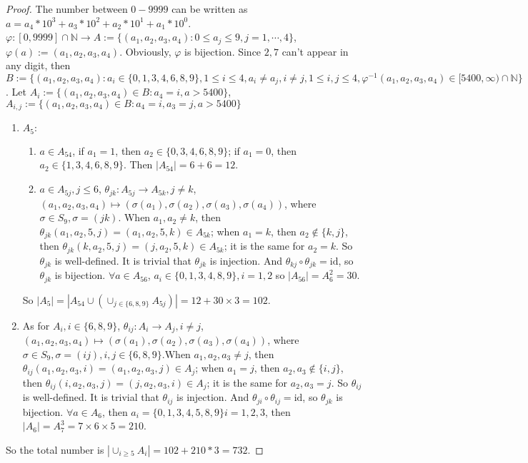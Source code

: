 \documentclass{ctexart}
\newcommand\N{\mathbb {N}}
\renewcommand\phi{\varphi}
\renewcommand{\(}{\left(}
\renewcommand{\)}{\right)}
\newcommand{\id}{\mathrm{id}}
\begin{document}
\begin{proof}
    The number between $0-9999$ can be written as $a = a_4*10^3+a_3*10^2+a_2*10^1+a_1*10^0$. $\phi: [0,9999]\cap \N\to A:=\{(a_1,a_2,a_3,a_4):0\leq a_j\leq 9, j=1,\cdots, 4\}$,  $\phi(a):=(a_1,a_2,a_3,a_4)$. Obviously, $\phi$ is bijection. 
    Since $2,7$ can't appear in any digit, then $
    B:=\{(a_1,a_2,a_3,a_4) : a_i\in\{0,1,3,4,6,8,9\}, 1\leq i\leq 4, a_i \neq a_j, i\neq j, 1\leq i,j\leq 4, \phi^{-1}(a_1,a_2,a_3,a_4)\in[5400,\infty)\cap\N\}$. Let $A_i:=\{(a_1,a_2,a_3,a_4)\in B: a_4=i, a>5400\}$, $A_{i,j}:=\{(a_1,a_2,a_3,a_4)\in B:a_4=i, a_3=j, a>5400 \}$
    \begin{enumerate}
        \item  $A_{5}:$
        \begin{enumerate}
        \item $a\in A_{54}$, if $a_1=1$, then $a_2\in\{0,3,4,6,8,9\}$; if $a_1=0$, then $a_2\in\{1,3,4,6,8,9\}$. Then $|A_{54}|=6+6=12$.
        \item $a\in A_{5j}, j\leq6$, 
        $\theta_{jk}: A_{5j}\to A_{5k},j\neq k$, $(a_1,a_2,a_3,a_4)\mapsto(\sigma(a_1),\sigma(a_2),\sigma(a_3),\sigma(a_4))$, where $\sigma\in S_9, \sigma=(j k)$.
        When $a_1,a_2\neq k$, then $\theta_{jk}(a_1,a_2,5,j)=(a_1,a_2,5,k)\in A_{5k}$; when $a_1= k$, then $a_2\notin\{k,j\}$, then $\theta_{jk}(k,a_2,5,j)=(j,a_2,5,k)\in A_{5k}$; it is the same for $a_2=k$. So $\theta_{jk}$ is well-defined. It is trivial that $\theta_{jk}$ is injection. And $\theta_{kj}\circ \theta_{jk}=\id$, so $\theta_{jk}$ is bijection. $\forall a \in A_{56}$, $a_i\in\{0,1,3,4,8,9\}, i=1,2$ so $|A_{56}|=A_{6}^{2}=30$. 
        \end{enumerate}
        So $|A_{5}|=|A_{54}\cup(\cup_{j\in\{6,8,9\}}A_{5j})|=12+30\times 3=102$.
        \item As for $A_{i}, i\in\{6,8,9\}$, $\theta_{ij}: A_{i}\to A_{j},i\neq j$, $(a_1,a_2,a_3,a_4)\mapsto(\sigma(a_1),\sigma(a_2),\sigma(a_3),\sigma(a_4))$, where $\sigma\in S_9, \sigma=(i j),  i,j\in\{6,8,9\}$.When $a_1,a_2,a_3\neq j$, then $\theta_{ij}(a_1,a_2,a_3,i)=(a_1,a_2,a_3,j)\in A_{j}$; when $a_1= j$, then $a_2,a_3\notin\{i,j\}$, then $\theta_{ij}(i,a_2,a_3,j)=(j,a_2,a_3,i)\in A_{j}$; it is the same for $a_2,a_3=j$. So $\theta_{ij}$ is well-defined. It is trivial that $\theta_{ij}$ is injection. And $\theta_{ji}\circ \theta_{ij}=\id$, so $\theta_{jk}$ is bijection. $\forall a\in A_{6}$, then $a_i=\{0,1,3,4,5,8,9\} i=1,2,3$, then $|A_6|=A_{7}^{3}=7\times 6\times 5=210$. 
    \end{enumerate}
    So the total number is $|\cup_{i\geq5}A_i|=102+210*3=732$.
\end{proof}
\end{document}
